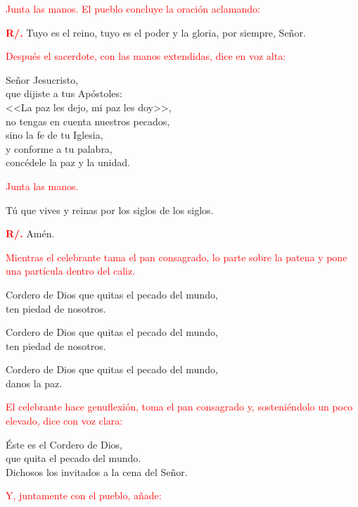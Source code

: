 \documentclass[12pt, letterpaper]{article}
\begin{document}
  \large{\textcolor{red}{Junta las manos. El pueblo concluye la oraci\'on aclamando:}}

  \noindent
  \Large {\bfseries \textcolor{red}{R/.}} \hspace{0.5cm} Tuyo es el reino, tuyo es el poder y la gloria, por siempre, Se\~nor.

  \large{\textcolor{red}{Despu\'es el sacerdote, con las manos extendidas, dice en voz alta:}}

  \noindent
  \Large Se\~nor Jesucristo,\\ 
  que dijiste a tus Ap\'ostoles:\\ 
  <<La paz les dejo, mi paz les doy>>,\\ 
  no tengas en cuenta nuestros pecados,\\ 
  sino la fe de tu Iglesia,\\ 
  y conforme a tu palabra,\\ 
  conc\'edele la paz y la unidad.

  \large{\textcolor{red}{Junta las manos.}}

  \Large T\'u que vives y reinas por los siglos de los siglos.

  \noindent
  \Large {\bfseries \textcolor{red}{R/.}} \hspace{0.5cm} Am\'en.

  \large{\textcolor{red}{Mientras el celebrante tama el pan consagrado, lo parte sobre la patena y pone una part\'icula dentro del caliz.}}

  \noindent
  \Large Cordero de Dios que quitas el pecado del mundo,\\
  ten piedad de nosotros.

  \noindent
  \Large Cordero de Dios que quitas el pecado del mundo,\\ 
  ten piedad de nosotros.

  \noindent
  \Large Cordero de Dios que quitas el pecado del mundo,\\ 
  danos la paz.

  \large{\textcolor{red}{El celebrante hace genuflexi\'on, toma el pan consagrado y, sosteni\'endolo un poco elevado, dice con voz clara:}}

  \noindent
  \Large \'Este es el Cordero de Dios,\\ 
  que quita el pecado del mundo.\\ 
  Dichosos los invitados a la cena del Se\~nor.

  \large{\textcolor{red}{Y, juntamente con el pueblo, a\~nade:}}
\end{document}
